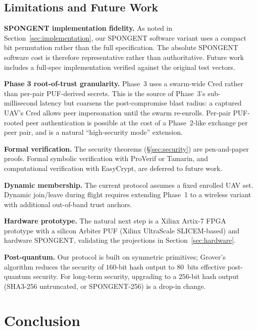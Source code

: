 \documentclass[journal,a4paper,10pt]{IEEEtran}
\begin{document}
\subsection{Limitations and Future Work}
\textbf{SPONGENT implementation fidelity.} As noted in
Section~\ref{sec:implementation}, our SPONGENT software variant uses
a compact bit permutation rather than the full specification. The
absolute SPONGENT software cost is therefore representative rather
than authoritative. Future work includes a full-spec implementation
verified against the original test vectors.

\textbf{Phase 3 root-of-trust granularity.} Phase~3 uses a swarm-wide
$\mathrm{Cred}$ rather than per-pair PUF-derived secrets. This is the
source of Phase~3's sub-millisecond latency but coarsens the
post-compromise blast radius: a captured UAV's $\mathrm{Cred}$ allows
peer impersonation until the swarm re-enrolls. Per-pair PUF-rooted
peer authentication is possible at the cost of a Phase~2-like
exchange per peer pair, and is a natural ``high-security mode''
extension.

\textbf{Formal verification.} The security theorems
(\S\ref{sec:security}) are pen-and-paper proofs. Formal symbolic
verification with ProVerif or Tamarin, and computational verification
with EasyCrypt, are deferred to future work.

\textbf{Dynamic membership.} The current protocol assumes a fixed
enrolled UAV set. Dynamic join/leave during flight requires extending
Phase~1 to a wireless variant with additional out-of-band trust
anchors.

\textbf{Hardware prototype.} The natural next step is a Xilinx
Artix-7 FPGA prototype with a silicon Arbiter PUF (Xilinx UltraScale
SLICEM-based) and hardware SPONGENT, validating the projections in
Section~\ref{sec:hardware}.

\textbf{Post-quantum.} Our protocol is built on symmetric primitives;
Grover's algorithm reduces the security of $160$-bit hash output to
$80$~bits effective post-quantum security. For long-term security,
upgrading to a $256$-bit hash output (SHA3-256 untruncated, or
SPONGENT-256) is a drop-in change.


\section{Conclusion}
\label{sec:conclusion}
\end{document}
